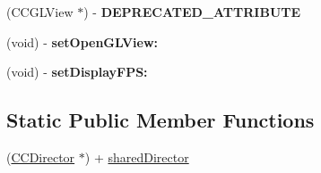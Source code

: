 \begin{DoxyCompactItemize}
\item 
\hypertarget{class_c_c_director_a0a51873a365415eaee2b32deb7bf98b4}{(C\-C\-G\-L\-View $\ast$) -\/ {\bfseries D\-E\-P\-R\-E\-C\-A\-T\-E\-D\-\_\-\-A\-T\-T\-R\-I\-B\-U\-T\-E}}\label{class_c_c_director_a0a51873a365415eaee2b32deb7bf98b4}

\item 
\hypertarget{class_c_c_director_acfd38ed90f478a5c4f59a2730feaf342}{(void) -\/ {\bfseries set\-Open\-G\-L\-View\-:}}\label{class_c_c_director_acfd38ed90f478a5c4f59a2730feaf342}

\item 
\hypertarget{class_c_c_director_a3c428508307a86308677a2ceee3b962b}{(void) -\/ {\bfseries set\-Display\-F\-P\-S\-:}}\label{class_c_c_director_a3c428508307a86308677a2ceee3b962b}

\end{DoxyCompactItemize}
\subsection*{Static Public Member Functions}
\begin{DoxyCompactItemize}
\item 
(\hyperlink{class_c_c_director}{C\-C\-Director} $\ast$) + \hyperlink{class_c_c_director_af77433a256fdbb77a1ffbe12d909c89c}{shared\-Director}
\end{DoxyCompactItemize}
